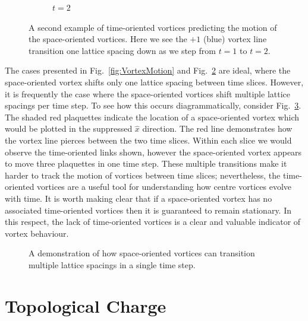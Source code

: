 \begin{figure}[htb!]
\begin{subfigure}[b]{0.45\textwidth}
\caption{\label{fig:VortexLineMotion2}$t=2$}
\end{subfigure}
\caption{\label{fig:VortexLineMotion}A second example of time-oriented vortices predicting the motion of the space-oriented vortices. Here we see the $+1$ (blue) vortex line transition one lattice spacing down as we step from $t=1$ to $t=2$.}
\end{figure}
%

The cases presented in Fig.~\ref{fig:VortexMotion} and Fig.~\ref{fig:VortexLineMotion} are ideal, where the space-oriented vortex shifts only one lattice spacing between time slices. However, it is frequently the case where the space-oriented vortices shift multiple lattice spacings per time step. To see how this occurs diagrammatically, consider Fig.~\ref{fig:ComplexStructure}. The shaded red plaquettes indicate the location of a space-oriented vortex which would be plotted in the suppressed $\hat{x}$ direction. The red line demonstrates how the vortex line pierces between the two time slices. Within each slice we would observe the time-oriented links shown, however the space-oriented vortex appears to move three plaquettes in one time step. These multiple transitions make it harder to track the motion of vortices between time slices; nevertheless, the time-oriented vortices are a useful tool for understanding how centre vortices evolve with time. It is worth making clear that if a space-oriented vortex has no associated time-oriented vortices then it is guaranteed to remain stationary. In this respect, the lack of time-oriented vortices is a clear and valuable indicator of vortex behaviour.
%
\begin{figure}[htb!]
\centering

\caption{\label{fig:ComplexStructure}A demonstration of how space-oriented vortices can transition multiple lattice spacings in a single time step.}
\end{figure}

\section{Topological Charge}\label{sec:TopChargeVis}

